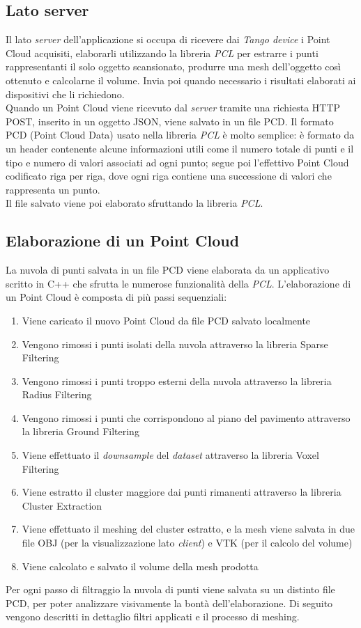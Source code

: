 \newpage

\subsection{Lato server}
Il lato \emph{server} dell'applicazione si occupa di ricevere dai \emph{Tango device} i Point Cloud acquisiti, elaborarli utilizzando la libreria \emph{PCL} per estrarre i punti rappresentanti il solo oggetto scansionato, produrre una mesh dell'oggetto così ottenuto e calcolarne il volume. Invia poi quando necessario i risultati elaborati ai dispositivi che li richiedono.\\
Quando un Point Cloud viene ricevuto dal \emph{server} tramite una richiesta HTTP POST, inserito in un oggetto JSON, viene salvato in un file PCD. Il formato PCD (Point Cloud Data) usato nella libreria \emph{PCL} è molto semplice: è formato da un header contenente alcune informazioni utili come il numero totale di punti e il tipo e numero di valori associati ad ogni punto; segue poi l'effettivo Point Cloud codificato riga per riga, dove ogni riga contiene una successione di valori che rappresenta un punto.\\
Il file salvato viene poi elaborato sfruttando la libreria \emph{PCL}.

\subsection{Elaborazione di un Point Cloud}

La nuvola di punti salvata in un file PCD viene elaborata da un applicativo scritto in C++ che sfrutta le numerose funzionalità della \emph{PCL}.
L'elaborazione di un Point Cloud è composta di più passi sequenziali:
\begin{enumerate}
\item Viene caricato il nuovo Point Cloud da file PCD salvato localmente
\item Vengono rimossi i punti isolati della nuvola attraverso la libreria Sparse Filtering
\item Vengono rimossi i punti troppo esterni della nuvola attraverso la libreria Radius Filtering 
\item Vengono rimossi i punti che corrispondono al piano del pavimento attraverso la libreria Ground Filtering
\item Viene effettuato il \emph{downsample} del \emph{dataset} attraverso la libreria Voxel Filtering
\item Viene estratto il cluster maggiore dai punti rimanenti attraverso la libreria Cluster Extraction
\item Viene effettuato il meshing del cluster estratto, e la mesh viene salvata in due file OBJ (per la visualizzazione lato \emph{client}) e VTK (per il calcolo del volume)
\item Viene calcolato e salvato il volume della mesh prodotta
\end{enumerate}
Per ogni passo di filtraggio la nuvola di punti viene salvata su un distinto file PCD, per poter analizzare visivamente la bontà dell'elaborazione.
Di seguito vengono descritti in dettaglio filtri applicati e il processo di meshing.

